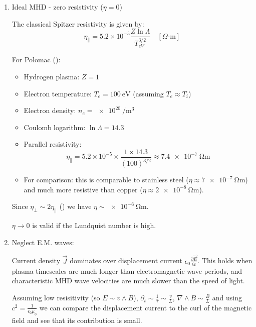 \begin{enumerate}
\begin{enumerate}
This is again connected to the fact that we assume electrons can move very fast.

\item Ideal MHD - zero resistivity ($\eta = 0$)

The classical Spitzer resistivity \cite{Chen2016} is given by:
\begin{equation*}
    \eta_\parallel = 5.2 \times 10^{-5} \frac{Z \ln\Lambda}{T_{eV}^{3/2}} \quad [\Omega\text{-m}]
\end{equation*}

For Polomac (\cite{Elio2024}):
\begin{itemize}
    \item Hydrogen plasma: $Z = 1$
    \item Electron temperature: $T_e = \SI{100}{\electronvolt}$ (assuming $T_e \approx T_i$)
    \item Electron density: $n_e = \SI{e20}{\per\meter\cubed}$
    \item Coulomb logarithm: $\ln\Lambda = 14.3$
    \item Parallel resistivity: 
    \begin{equation*}
        \eta_\parallel = 5.2 \times 10^{-5} \times \frac{1 \times 14.3}{(100)^{3/2}} \approx \SI{7.4e-7}{\ohm\meter}
    \end{equation*}
    \item For comparison: this is comparable to stainless steel ($\eta \approx \SI{7e-7}{\ohm\meter}$) and much more resistive than copper ($\eta \approx \SI{2e-8}{\ohm\meter}$).
\end{itemize}

Since $\eta_\perp \sim 2 \eta_\parallel$ (\cite{Chen2016}) we have $\eta \sim \SI{e-6}{\ohm\meter}$.

{\color{magenta}
$\eta\to 0$ is valid if the Lundquist number is high.
}

\item Neglect E.M. waves:

Current density $\vec{J}$ dominates over displacement current $\epsilon_0 \frac{\partial \vec{E}}{\partial t}$.
This holds when plasma timescales are much longer than electromagnetic wave periods, and characteristic MHD wave velocities are much slower than the speed of light.

Assuming low resisitivity (so $E \sim v \wedge B$), $\partial_t \sim \frac{1}{\tau} \sim \frac{v}{L}$, $\nabla \wedge B \sim \frac{B}{L}$ and using $c^2 = \frac{1}{\epsilon_0 \mu_0}$
we can compare the displacement current to the curl of the magnetic field and see that its contribution is small.


\end{enumerate}
\end{enumerate}

